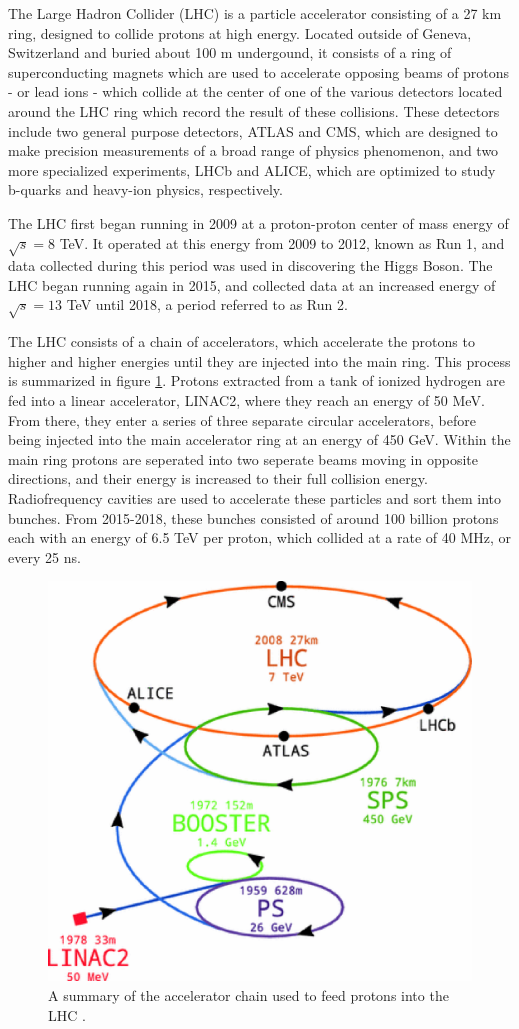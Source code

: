 The Large Hadron Collider (LHC) is a particle accelerator consisting of a 27 km ring, designed to collide protons at high energy. Located outside of Geneva, Switzerland and buried about 100 m undergound, it consists of a ring of superconducting magnets which are used to accelerate opposing beams of protons - or lead ions - which collide at the center of one of the various detectors located around the LHC ring which record the result of these collisions. These detectors include two general purpose detectors, ATLAS and CMS, which are designed to make precision measurements of a broad range of physics phenomenon, and two more specialized experiments, LHCb and ALICE, which are optimized to study b-quarks and heavy-ion physics, respectively.

The LHC first began running in 2009 at a proton-proton center of mass energy of $\sqrt{s} = 8$ TeV. It operated at this energy from 2009 to 2012, known as Run 1, and data collected during this period was used in discovering the Higgs Boson. The LHC began running again in 2015, and collected data at an increased energy of $\sqrt{s} = 13$ TeV until 2018, a period referred to as Run 2. 

The LHC consists of a chain of accelerators, which accelerate the protons to higher and higher energies until they are injected into the main ring. This process is summarized in figure \ref{fig:AccChain}. Protons extracted from a tank of ionized hydrogen are fed into a linear accelerator, LINAC2, where they reach an energy of 50 MeV. From there, they enter a series of three separate circular accelerators, before being injected into the main accelerator ring at an energy of 450 GeV. Within the main ring protons are seperated into two seperate beams moving in opposite directions, and their energy is increased to their full collision energy. Radiofrequency cavities are used to accelerate these particles and sort them into bunches. From 2015-2018, these bunches consisted of around 100 billion protons each with an energy of 6.5 TeV per proton, which collided at a rate of 40 MHz, or every 25 ns. 

\begin{figure}[H]
\centering
   \includegraphics[width=0.7\linewidth]{figures/lhc/AccChain.eps}
\caption{A summary of the accelerator chain used to feed protons into the LHC \cite{accChainFig}.}
\label{fig:AccChain}
\end{figure}

